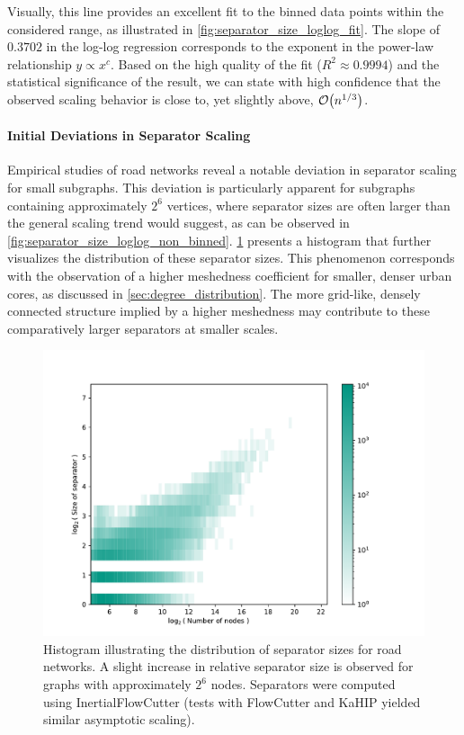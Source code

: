 Visually, this line provides an excellent fit to the binned data points within the considered range, as illustrated in \cref{fig:separator_size_loglog_fit}.
The slope of \( 0.3702 \) in the log-log regression corresponds to the exponent in the power-law relationship \( y \propto x^c \).
Based on the high quality of the fit (\( R^2 \approx 0.9994 \)) and the statistical significance of the result, we can state with high confidence that the observed scaling behavior is close to, yet slightly above, \( \mathcal{O}\!\left(n^{1/3}\right) \).

\paragraph{Initial Deviations in Separator Scaling}
Empirical studies of road networks reveal a notable deviation in separator scaling for small subgraphs.
This deviation is particularly apparent for subgraphs containing approximately \(2^6\) vertices, where separator sizes are often larger than the general scaling trend would suggest, as can be observed in \cref{fig:separator_size_loglog_non_binned}.
\cref{fig:real_europe_hist} presents a histogram that further visualizes the distribution of these separator sizes.
This phenomenon corresponds with the observation of a higher meshedness coefficient for smaller, denser urban cores, as discussed in \cref{sec:degree_distribution}.
The more grid-like, densely connected structure implied by a higher meshedness may contribute to these comparatively larger separators at smaller scales.

\begin{figure}[tbhp]
    \centering
    \includegraphics[width=0.6\linewidth]{graphics/Germany-hist.pdf}
    \caption{Histogram illustrating the distribution of separator sizes for road networks. A slight increase in relative separator size is observed for graphs with approximately \(2^6\) nodes. Separators were computed using InertialFlowCutter (tests with FlowCutter and KaHIP yielded similar asymptotic scaling).}
    \label{fig:real_europe_hist}
\end{figure}

